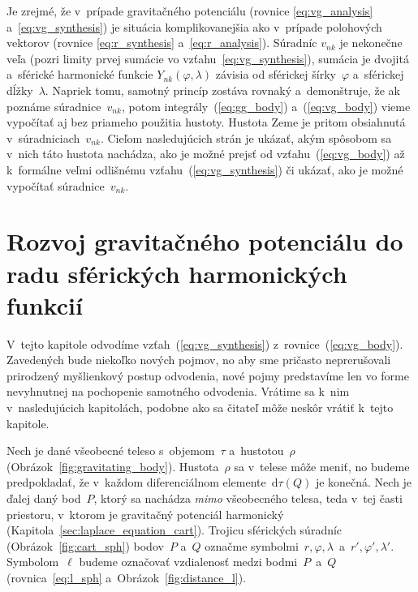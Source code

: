 \documentclass[a4paper, 12pt]{book}
\newcommand{\diff}{\mathrm d}
\begin{document}
Je zrejmé, že v~prípade gravitačného potenciálu (rovnice \ref{eq:vg_analysis}
a~\ref{eq:vg_synthesis}) je situácia komplikovanejšia ako v~prípade polohových
vektorov (rovnice \ref{eq:r_synthesis} a~\ref{eq:r_analysis}).  Súradníc
$v_{nk}$ je nekonečne veľa (pozri limity prvej sumácie vo
vzťahu~\ref{eq:vg_synthesis}), sumácia je dvojitá a~sférické harmonické funkcie
$Y_{nk}(\varphi, \lambda)$ závisia od sférickej šírky~$\varphi$ a~sférickej
dĺžky~$\lambda$.  Napriek tomu, samotný princíp zostáva rovnaký a~demonštruje, 
že ak poznáme súradnice~$v_{nk}$, potom
integrály~(\ref{eq:gg_body}) a~(\ref{eq:vg_body}) vieme vypočítať aj bez
priameho použitia hustoty.  Hustota Zeme je pritom obsiahnutá 
v~súradniciach~$v_{nk}$.  Cieľom nasledujúcich strán je ukázať, akým spôsobom 
sa v~nich táto hustota nachádza, ako je možné prejsť od 
vzťahu~(\ref{eq:vg_body}) až k~formálne veľmi odlišnému 
vzťahu~(\ref{eq:vg_synthesis}) či ukázať, ako je možné vypočítať 
súradnice~$v_{nk}$.



\section{Rozvoj gravitačného potenciálu do radu sférických harmonických
funkcií}
\label{sec:vg_sh_expansion}

V~tejto kapitole odvodíme vzťah~(\ref{eq:vg_synthesis})
z~rovnice~(\ref{eq:vg_body}).  Zavedených bude niekoľko nových pojmov, no aby 
sme pričasto neprerušovali prirodzený myšlienkový postup odvodenia, nové pojmy
predstavíme len vo forme nevyhnutnej na pochopenie samotného odvodenia.
Vrátime sa k~nim v~nasledujúcich kapitolách, podobne ako sa čitateľ môže neskôr 
vrátiť k~tejto kapitole.

Nech je dané všeobecné teleso s~objemom~$\tau$ a~hustotou~$\rho$
(Obrázok~\ref{fig:gravitating_body}).  Hustota~$\rho$ sa v~telese môže meniť,
no budeme predpokladať, že v~každom diferenciálnom elemente~$\diff \tau(Q)$ je
konečná.  Nech je ďalej daný bod~$P$, ktorý sa nachádza \emph{mimo} všeobecného
telesa, teda v~tej časti priestoru, v~ktorom je gravitačný potenciál harmonický
(Kapitola~\ref{sec:laplace_equation_cart}).  Trojicu sférických súradníc 
(Obrázok~\ref{fig:cart_sph}) bodov~$P$ a~$Q$ označme symbolmi~$r, \varphi,
\lambda$~a~$r', \varphi', \lambda'$.  Symbolom~$\ell$ budeme označovať 
vzdialenosť medzi bodmi~$P$~a~$Q$ (rovnica~\ref{eq:l_sph} 
a~Obrázok~\ref{fig:distance_l}).
\end{document}
